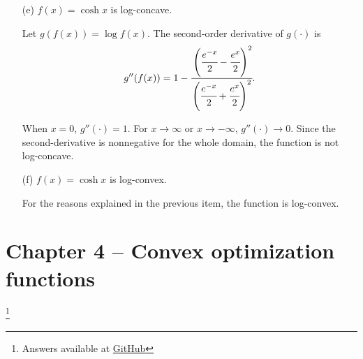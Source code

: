 \documentclass[11pt,a4paper]{article}
\begin{document}
\begin{itemize}
\begin{itemize}
        \item[(e)] $f(x) = \cosh x$ is log-concave.
        
        Let $g(f(x)) = \log f(x)$. The second-order derivative of $g(\cdot)$ is 
        \begin{equation*}
            g''(f(x)) = 1 - \cfrac{\left(\cfrac{e^{-x}}{2} - \cfrac{e^{x}}{2}\right)^2}{\left(\cfrac{e^{-x}}{2} + \cfrac{e^{x}}{2}\right)^2}.
        \end{equation*}

        When $x = 0$, $g''(\cdot) = 1$. For $x \to \infty$ or $x \to -\infty$, $g''(\cdot) \to 0$. Since the second-derivative is nonnegative for the whole domain, the function is not log-concave.

        \item[(f)] $f(x) = \cosh x$ is log-convex.
        
        For the reasons explained in the previous item, the function is log-convex. 
    \end{itemize}
\end{itemize}

\section*{Chapter 4 -- Convex optimization functions}\footnote{Answers available at \href{https://github.com/felypemaciel/lamps/blob/main/dcp_examples.ipynb}{GitHub}}
\end{document}
